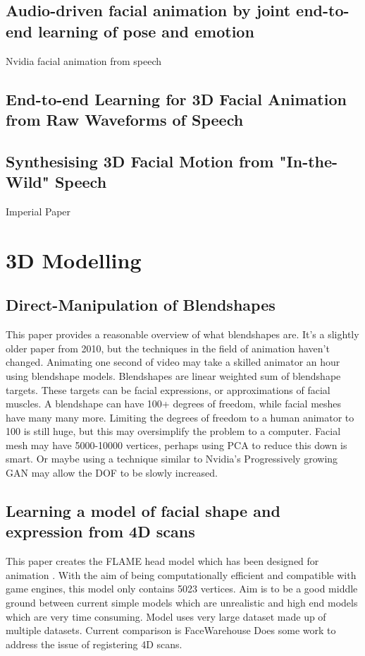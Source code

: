 \documentclass[12pt]{article}
\begin{document}
\subsection{Audio-driven facial animation by joint end-to-end learning of pose
and emotion}
Nvidia facial animation from speech \cite{Karras2017a}

\subsection{End-to-end Learning for 3D Facial Animation from Raw Waveforms of
Speech}
\cite{Pham2017}

\subsection{Synthesising 3D Facial Motion from "In-the-Wild" Speech}
Imperial Paper \cite{Tzirakis2019}

\section{3D Modelling}
\subsection{Direct-Manipulation of Blendshapes}
This paper \cite{Lewis2010} provides a reasonable overview of what blendshapes are.
It's a slightly older paper from 2010, but the techniques in the field of animation haven't changed.
Animating one second of video may take a skilled animator an hour using blendshape models.
Blendshapes are linear weighted sum of blendshape targets.
These targets can be facial expressions, or approximations of facial muscles.
A blendshape can have 100+ degrees of freedom, while facial meshes have many many more.
Limiting the degrees of freedom to a human animator to 100 is still huge, but this may oversimplify the problem to a computer.
Facial mesh may have 5000-10000 vertices, perhaps using PCA to reduce this down is smart.
Or maybe using a technique similar to Nvidia's Progressively growing GAN \cite{Karras2017b} may allow the DOF to be slowly increased.

\subsection{Learning a model of facial shape and expression from 4D scans}
This paper creates the FLAME head model which has been designed for animation \cite{Li2017}.
With the aim of being computationally efficient and compatible with game engines, this model only contains 5023 vertices.
Aim is to be a good middle ground between current simple models which are unrealistic and high end models which are very time consuming.
Model uses very large dataset made up of multiple datasets.
Current comparison is FaceWarehouse
Does some work to address the issue of registering 4D scans.
\end{document}
